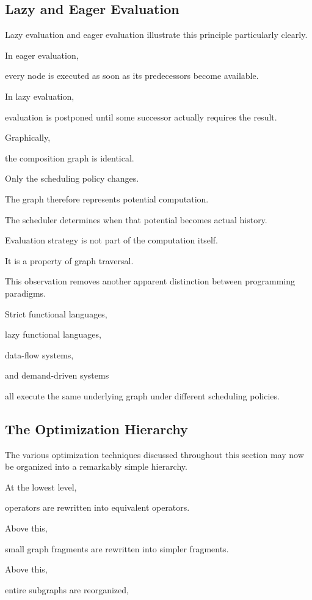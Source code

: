 \documentclass[12pt,oneside]{article}
\begin{document}
\subsection{Lazy and Eager Evaluation}

Lazy evaluation and eager evaluation illustrate this principle particularly clearly.

In eager evaluation,

every node is executed as soon as its predecessors become available.

In lazy evaluation,

evaluation is postponed until some successor actually requires the result.

Graphically,

the composition graph is identical.

Only the scheduling policy changes.

The graph therefore represents potential computation.

The scheduler determines when that potential becomes actual history.

Evaluation strategy is not part of the computation itself.

It is a property of graph traversal.

This observation removes another apparent distinction between programming paradigms.

Strict functional languages,

lazy functional languages,

data-flow systems,

and demand-driven systems

all execute the same underlying graph under different scheduling policies.

\subsection{The Optimization Hierarchy}

The various optimization techniques discussed throughout this section may now be organized into a remarkably simple hierarchy.

At the lowest level,

operators are rewritten into equivalent operators.

Above this,

small graph fragments are rewritten into simpler fragments.

Above this,

entire subgraphs are reorganized,
\end{document}
